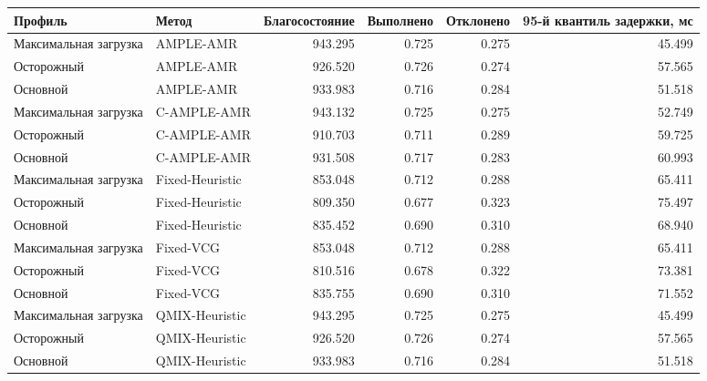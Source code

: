 \begin{tabular}{llrrrr}
\toprule
 Профиль & Метод & Благосостояние & Выполнено & Отклонено & 95-й квантиль задержки, мс \\
\midrule
 Максимальная загрузка & AMPLE-AMR & 943.295 & 0.725 & 0.275 & 45.499 \\
 Осторожный & AMPLE-AMR & 926.520 & 0.726 & 0.274 & 57.565 \\
 Основной & AMPLE-AMR & 933.983 & 0.716 & 0.284 & 51.518 \\
 Максимальная загрузка & C-AMPLE-AMR & 943.132 & 0.725 & 0.275 & 52.749 \\
 Осторожный & C-AMPLE-AMR & 910.703 & 0.711 & 0.289 & 59.725 \\
 Основной & C-AMPLE-AMR & 931.508 & 0.717 & 0.283 & 60.993 \\
 Максимальная загрузка & Fixed-Heuristic & 853.048 & 0.712 & 0.288 & 65.411 \\
 Осторожный & Fixed-Heuristic & 809.350 & 0.677 & 0.323 & 75.497 \\
 Основной & Fixed-Heuristic & 835.452 & 0.690 & 0.310 & 68.940 \\
 Максимальная загрузка & Fixed-VCG & 853.048 & 0.712 & 0.288 & 65.411 \\
 Осторожный & Fixed-VCG & 810.516 & 0.678 & 0.322 & 73.381 \\
 Основной & Fixed-VCG & 835.755 & 0.690 & 0.310 & 71.552 \\
 Максимальная загрузка & QMIX-Heuristic & 943.295 & 0.725 & 0.275 & 45.499 \\
 Осторожный & QMIX-Heuristic & 926.520 & 0.726 & 0.274 & 57.565 \\
 Основной & QMIX-Heuristic & 933.983 & 0.716 & 0.284 & 51.518 \\
\bottomrule
\end{tabular}

